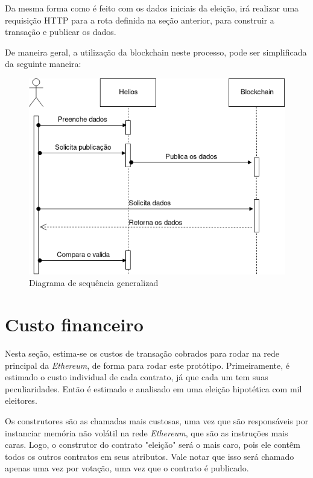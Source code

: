 \documentclass{ufsctex/ufsctex}
\begin{document}
Da mesma forma como é feito com os dados iniciais da eleição, irá realizar uma
requisição HTTP para a rota definida na seção anterior, para construir a
transação e publicar os dados.

De maneira geral, a utilização da blockchain neste processo, pode ser
simplificada da seguinte maneira:

\begin{figure}[H]
	\centering
	\includegraphics[width=\linewidth]{voting}
	\caption{Diagrama de sequência generalizad}
	\label{fig:helios-2}
\end{figure}

\section{Custo financeiro}

Nesta seção, estima-se os custos de transação cobrados para rodar na rede
principal da \textit{Ethereum}, de forma para rodar este protótipo.
Primeiramente, é estimado o custo individual de cada contrato, já que cada um
tem suas peculiaridades. Então é estimado e analisado em uma eleição hipotética
com mil eleitores. 

Os construtores são as chamadas mais custosas, uma vez que são responsáveis por
instanciar memória não volátil na rede \textit{Ethereum}, que são as instruções
mais caras. Logo, o construtor do contrato "eleição" será o mais caro, pois ele
contêm todos os outros contratos em seus atributos. Vale notar que isso será
chamado apenas uma vez por votação, uma vez que o contrato é publicado.
\end{document}
